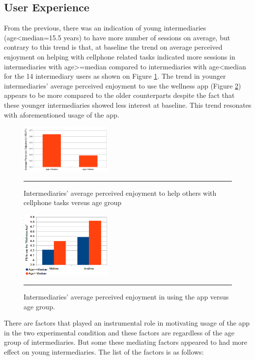 \documentclass{sig-alternate}
\begin{document}
\subsection{User Experience}
From the previous, there was an indication of young intermediaries (age\textless median=15.5 years) to have more number of sessions on average, but contrary to this trend is that, at baseline the trend on average perceived enjoyment on helping with cellphone related tasks indicated more sessions in intermediaries with age\textgreater=median compared to intermediaries with age\textless median for the 14 intermediary users as shown on Figure \ref{figure:PE_HELP_Age}. The trend in younger intermediaries' average perceived enjoyment to use the wellness app (Figure \ref{figure:PE_Interm_App})  appears to be more compared to the older counterparts despite the fact that these younger intermediaries showed less interest at baseline. This trend resonates with aforementioned usage of the app.\newline
\begin{figure}[htbp]
  \centering
    \includegraphics[width=0.4\textwidth]{PE_HELP_Age.png}
    \rule{26em}{0.5pt}
  \caption{Intermediaries' average perceived enjoyment to help others with cellphone tasks versus age group}
  \label{figure:PE_HELP_Age}
\end{figure}\newline
\begin{figure}[htbp]
  \centering
    \includegraphics[width=0.4\textwidth]{PE_Interm_App.png}
    \rule{26em}{0.5pt}
  \caption{Intermediaries' average perceived enjoyment in using the app versus age group.}
  \label{figure:PE_Interm_App}
\end{figure}\newline
There are factors that played an instrumental role in motivating usage of the app in the two experimental condition and these factors are regardless of the age group of intermediaries. But some these mediating factors appeared to had more effect on young intermediaries. The list of the factors is as follows:
\end{document}
